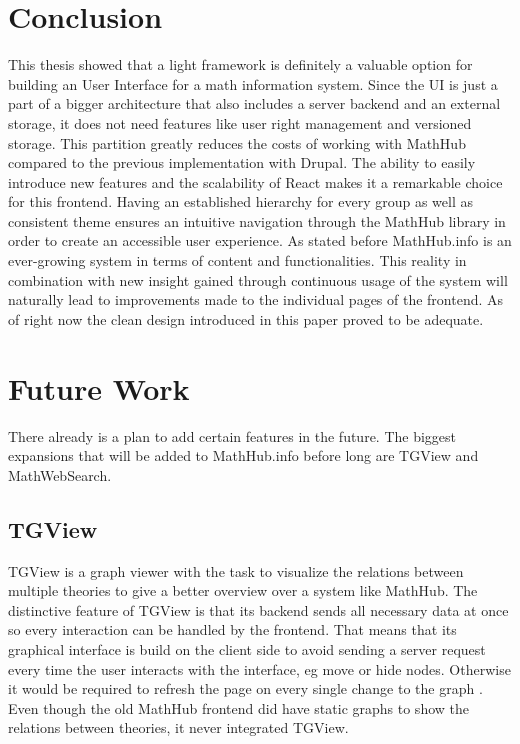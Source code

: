 \documentclass[11pt,a4paper]{article}
\begin{document}
\section{Conclusion} \label{conclusion}
This thesis showed that a light framework is definitely a valuable option for building an User Interface for a math information system.
Since the UI is just a part of a bigger architecture that also includes a server backend and an external storage, it does not need features like user right management and versioned storage.
This partition greatly reduces the costs of working with MathHub compared to the previous implementation with Drupal.
The ability to easily introduce new features and the scalability of React makes it a remarkable choice for this frontend.
\newline \newline
Having an established hierarchy for every group as well as consistent theme ensures an intuitive navigation through the MathHub library in order to create an accessible user experience.
As stated before MathHub.info is an ever-growing system in terms of content and functionalities.
This reality in combination with new insight gained through continuous usage of the system will naturally lead to improvements made to the individual pages of the frontend.
As of right now the clean design introduced in this paper proved to be adequate.

\section{Future Work} \label{future}
There already is a plan to add certain features in the future. 
The biggest expansions that will be added to MathHub.info before long are TGView and MathWebSearch.

\subsection{TGView} 
TGView is a graph viewer with the task to visualize the relations between multiple theories to give a better overview over a system like MathHub.
The distinctive feature of TGView is that its backend sends all necessary data at once so every interaction can be handled by the frontend.
That means that its graphical interface is build on the client side to avoid sending a server request every time the user interacts with the interface, eg move or hide nodes.
Otherwise it would be required to refresh the page on every single change to the graph \cite{tgview}.
\newline \newline 
Even though the old MathHub frontend did have static graphs to show the relations between theories, it never integrated TGView.
 
\end{document}
